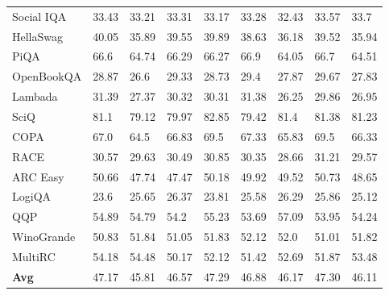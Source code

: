 \documentclass{article}
\theoremstyle{definition}
\theoremstyle{remark}
\begin{document}
\begin{table}[!ht]
\begin{tabular}{lllllllll}
        Social IQA & 33.43 & 33.21 & 33.31 & 33.17 & 33.28 & 32.43 & 33.57 & 33.7 \\ 
        HellaSwag & 40.05 & 35.89 & 39.55 & 39.89 & 38.63 & 36.18 & 39.52 & 35.94 \\ 
        PiQA & 66.6 & 64.74 & 66.29 & 66.27 & 66.9 & 64.05 & 66.7 & 64.51 \\ 
        OpenBookQA & 28.87 & 26.6 & 29.33 & 28.73 & 29.4 & 27.87 & 29.67 & 27.83 \\ 
        Lambada & 31.39 & 27.37 & 30.32 & 30.31 & 31.38 & 26.25 & 29.86 & 26.95 \\ 
        SciQ & 81.1 & 79.12 & 79.97 & 82.85 & 79.42 & 81.4 & 81.38 & 81.23 \\ 
        COPA & 67.0 & 64.5 & 66.83 & 69.5 & 67.33 & 65.83 & 69.5 & 66.33 \\ 
        RACE & 30.57 & 29.63 & 30.49 & 30.85 & 30.35 & 28.66 & 31.21 & 29.57 \\ 
        ARC Easy & 50.66 & 47.74 & 47.47 & 50.18 & 49.92 & 49.52 & 50.73 & 48.65 \\ 
        LogiQA & 23.6 & 25.65 & 26.37 & 23.81 & 25.58 & 26.29 & 25.86 & 25.12 \\ 
        QQP & 54.89 & 54.79 & 54.2 & 55.23 & 53.69 & 57.09 & 53.95 & 54.24 \\ 
        WinoGrande & 50.83 & 51.84 & 51.05 & 51.83 & 52.12 & 52.0 & 51.01 & 51.82 \\ 
        MultiRC & 54.18 & 54.48 & 50.17 & 52.12 & 51.42 & 52.69 & 51.87 & 53.48 \\ 
        \midrule
        \textbf{Avg} & 47.17 & 45.81 & 46.57 & 47.29 & 46.88 & 46.17 & 47.30 & 46.11 \\ \bottomrule    
        \end{tabular}
\end{table}
\end{document}
